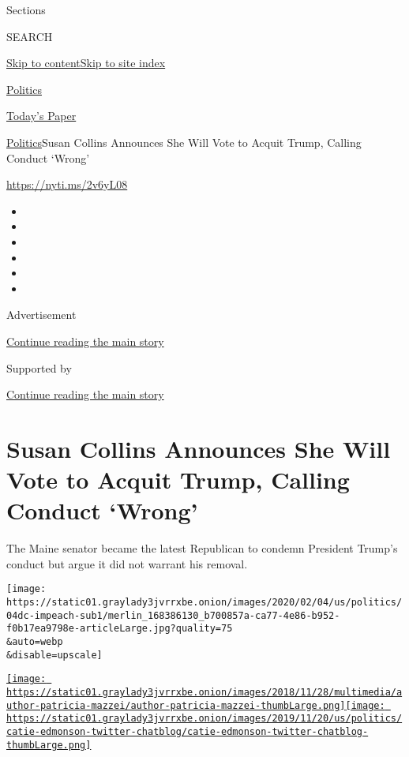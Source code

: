 Sections

SEARCH

\protect\hyperlink{site-content}{Skip to
content}\protect\hyperlink{site-index}{Skip to site index}

\href{https://www.nytimes3xbfgragh.onion/section/politics}{Politics}

\href{https://myaccount.nytimes3xbfgragh.onion/auth/login?response_type=cookie\&client_id=vi}{}

\href{https://www.nytimes3xbfgragh.onion/section/todayspaper}{Today's
Paper}

\href{/section/politics}{Politics}\textbar{}Susan Collins Announces She
Will Vote to Acquit Trump, Calling Conduct `Wrong'

\url{https://nyti.ms/2v6yL08}

\begin{itemize}
\item
\item
\item
\item
\item
\item
\end{itemize}

Advertisement

\protect\hyperlink{after-top}{Continue reading the main story}

Supported by

\protect\hyperlink{after-sponsor}{Continue reading the main story}

\hypertarget{susan-collins-announces-she-will-vote-to-acquit-trump-calling-conduct-wrong}{%
\section{Susan Collins Announces She Will Vote to Acquit Trump, Calling
Conduct
`Wrong'}\label{susan-collins-announces-she-will-vote-to-acquit-trump-calling-conduct-wrong}}

The Maine senator became the latest Republican to condemn President
Trump's conduct but argue it did not warrant his removal.

\texttt{[image: https://static01.graylady3jvrrxbe.onion/images/2020/02/04/us/politics/04dc-impeach-sub1/merlin\_168386130\_b700857a-ca77-4e86-b952-f0b17ea9798e-articleLarge.jpg?quality=75\\\&auto=webp\\\&disable=upscale]}

\href{https://www.nytimes3xbfgragh.onion/by/patricia-mazzei}{\texttt{[image: https://static01.graylady3jvrrxbe.onion/images/2018/11/28/multimedia/author-patricia-mazzei/author-patricia-mazzei-thumbLarge.png]}}\href{https://www.nytimes3xbfgragh.onion/by/catie-edmondson}{\texttt{[image: https://static01.graylady3jvrrxbe.onion/images/2019/11/20/us/politics/catie-edmonson-twitter-chatblog/catie-edmonson-twitter-chatblog-thumbLarge.png]}}

